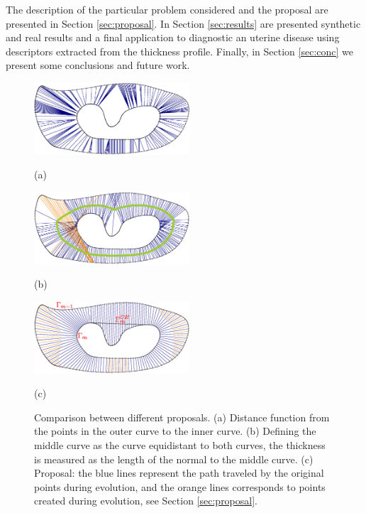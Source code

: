 \documentclass{article}
\begin{document}
The description of the particular problem considered and the proposal are presented in Section \ref{sec:proposal}. In Section \ref{sec:results} are presented synthetic and real results and a final application to diagnostic an uterine disease using descriptors extracted from the thickness profile. Finally, in Section \ref{sec:conc} we present some conclusions and future work.
\begin{figure}[t]
\begin{minipage}[b]{.32\linewidth}
  \centering
  \centerline{\includegraphics[width=5.8cm]{pics/cmp_dist}}
  \centerline{(a)}\medskip
\end{minipage}
\hfill
\begin{minipage}[b]{.32\linewidth}
  \centering
  \centerline{\includegraphics[width=5.8cm]{pics/cmp_norm2}}
  \centerline{(b)}\medskip
\end{minipage}
\hfill
\begin{minipage}[b]{.32\linewidth}
  \centering
  \centerline{\includegraphics[width=5.8cm]{pics/cmp_evol}}
  \centerline{(c)}\medskip
\end{minipage}
\caption{Comparison between different proposals. (a) Distance function from the points in the outer curve to the inner curve. (b) Defining the middle curve as the curve equidistant to both curves, the thickness is measured as the length of the normal to the middle curve. (c) Proposal: the blue lines represent the path traveled by the original points during evolution, and the orange lines corresponds to points created during evolution, see Section \ref{sec:proposal}.}
\label{fig:comp}
\end{figure}
\end{document}
